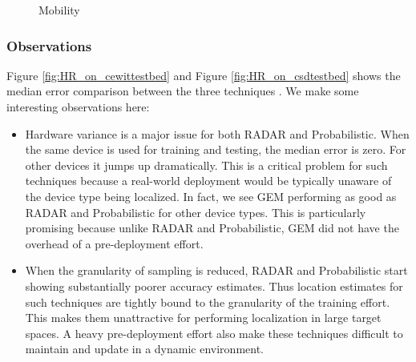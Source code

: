 \begin{figure}
	\centering
	\caption{Mobility}
	\label{fig:mobility}
\end{figure}

\subsubsection{Observations}
\label{subsubsec:rfsignalmapobservations}

Figure \ref{fig:HR_on_cewittestbed} and Figure \ref{fig:HR_on_csdtestbed} shows the median error comparison between the three techniques . We make some interesting observations here:
 
\begin{itemize}

\item Hardware variance is a major issue for both RADAR and Probabilistic. When the same device is used for training and testing, the median error is zero. For other devices it jumps up dramatically. This is a critical problem for such techniques because a real-world deployment would be typically unaware of the device type being localized. In fact, we see GEM performing as good as RADAR and Probabilistic for other device types. This is particularly promising because unlike RADAR and Probabilistic, GEM did not have the overhead of a pre-deployment effort.

\item When the granularity of sampling is reduced, RADAR and Probabilistic start showing substantially poorer accuracy estimates. Thus location estimates for such techniques are tightly bound to the granularity of the training effort. This makes them unattractive for performing localization in large target spaces. A heavy pre-deployment effort also make these techniques difficult to maintain and  update in a dynamic environment.

\end{itemize}

